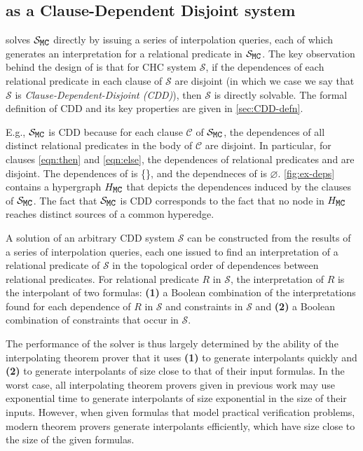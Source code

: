 \subsection{ as a Clause-Dependent Disjoint system}
\label{sec:solve-ex}
\sys solves $\mcchc$ directly by issuing a series of
interpolation queries, each of which generates an interpretation for a
relational predicate in $\mcchc$.
%
The key observation behind the design of \sys is that for CHC system
$\mathcal{S}$, if the dependences of each relational predicate in
each clause of $\mathcal{S}$ are disjoint (in which we case we say
that $\mathcal{S}$ is \emph{Clause-Dependent-Disjoint (CDD)}), then
$\mathcal{S}$ is directly solvable.
%
The formal definition of CDD and its key properties are given in
\autoref{sec:CDD-defn}.

E.g., $\mcchc$ is CDD because for each clause $\mathcal{C}$ of
$\mcchc$, the dependences of all distinct relational predicates in the
body of $\mathcal{C}$ are disjoint.
%
In particular, for clauses \autoref{eqn:then} and \autoref{eqn:else},
the dependences of relational predicates  and  are
disjoint.
%
The dependences of  is \{\}, and the dependneces of 
is $\varnothing$.
%
\autoref{fig:ex-deps} contains a hypergraph $H_{\cc{MC}}$ that depicts
the dependences induced by the clauses of $\mcchc$.
%
The fact that $\mcchc$ is CDD corresponds to the fact that no node in
$H_{\cc{MC}}$ reaches distinct sources of a common hyperedge.

A solution of an arbitrary CDD system $\mathcal{S}$ can be constructed
from the results of a series of interpolation queries, each one issued
to find an interpretation of a relational predicate of $\mathcal{S}$
in the topological order of dependences between relational predicates.
%
For relational predicate $R$ in $\mathcal{S}$, the interpretation of
$R$ is the interpolant of two formulas: %
\textbf{(1)} a Boolean combination of the interpretations found for
each dependence of $R$ in $\mathcal{S}$ and constraints in
$\mathcal{S}$ and %
\textbf{(2)} a Boolean combination of constraints that occur in
$\mathcal{S}$.

The performance of the solver is thus largely determined by the
ability of the interpolating theorem prover that it uses \textbf{(1)}
to generate interpolants quickly and %
\textbf{(2)} to generate interpolants of size close to that of their
input formulas.
%
In the worst case, all interpolating theorem provers given in previous
work may use exponential time to generate interpolants of size
exponential in the size of their inputs.
%
However, when given formulas that model practical verification
problems, modern theorem provers generate interpolants efficiently,
which have size close to the size of the given formulas.

